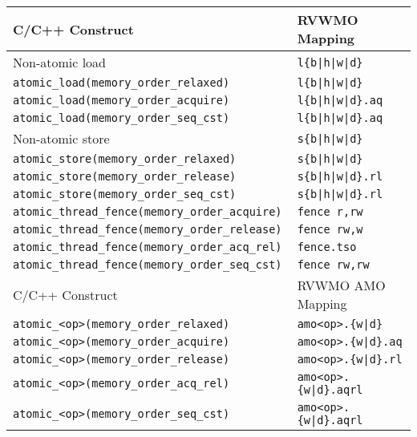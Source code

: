 \begin{table}[h!]
  \centering
  \begin{tabular}{|l|l|}
    \hline
    C/C++ Construct                            & RVWMO Mapping \\
    \hline
    \hline
    Non-atomic load                            & \tt l\{b|h|w|d\}               \\
    \hline
    \tt atomic\_load(memory\_order\_relaxed)   & \tt l\{b|h|w|d\}               \\
    \hline
    \tt atomic\_load(memory\_order\_acquire)   & \tt l\{b|h|w|d\}.aq  \\
    \hline
    \tt atomic\_load(memory\_order\_seq\_cst)  & \tt l\{b|h|w|d\}.aq  \\
    \hline
    \hline
    Non-atomic store                           & \tt s\{b|h|w|d\}               \\
    \hline
    \tt atomic\_store(memory\_order\_relaxed)  & \tt s\{b|h|w|d\}               \\
    \hline
    \tt atomic\_store(memory\_order\_release)  & \tt s\{b|h|w|d\}.rl  \\
    \hline
    \tt atomic\_store(memory\_order\_seq\_cst) & \tt s\{b|h|w|d\}.rl \\
    \hline
    \hline
    \tt atomic\_thread\_fence(memory\_order\_acquire)  & \tt fence r,rw \\
    \hline
    \tt atomic\_thread\_fence(memory\_order\_release)  & \tt fence rw,w \\
    \hline
    \tt atomic\_thread\_fence(memory\_order\_acq\_rel) & {\tt fence.tso} \\
    \hline
    \tt atomic\_thread\_fence(memory\_order\_seq\_cst) & \tt fence rw,rw \\
    \hline
    \hline
    C/C++ Construct                           & RVWMO AMO Mapping    \\
    \hline
    \tt atomic\_<op>(memory\_order\_relaxed)  & \tt amo<op>.\{w|d\}      \\
    \hline
    \tt atomic\_<op>(memory\_order\_acquire)  & \tt amo<op>.\{w|d\}.aq   \\
    \hline
    \tt atomic\_<op>(memory\_order\_release)  & \tt amo<op>.\{w|d\}.rl   \\
    \hline
    \tt atomic\_<op>(memory\_order\_acq\_rel) & \tt amo<op>.\{w|d\}.aqrl \\
    \hline
    \tt atomic\_<op>(memory\_order\_seq\_cst) & \tt amo<op>.\{w|d\}.aqrl \\
    \hline

\end{tabular}
\end{table}
